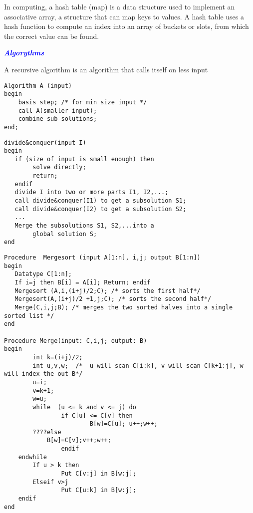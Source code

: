 \documentclass[9pt]{amsart}
\newcommand{\filldots}{\noindent \textbf {\textcolor {blue} {\dotfill}} }
\begin{document}
\begin{multicols}{2}
\noindent In computing, a hash table (map) is a data structure used to implement an associative array, a structure that can map keys to values. A hash table uses a hash function to compute an index into an array of buckets or slots, from which the correct value can be found.

\filldots 

\noindent \textbf {\textcolor {blue} {\em Algorythms}} 
\noindent 
\filldots 

\noindent {\textcolor {blue} {\em Recursion}} 

\noindent A recursive algorithm is an algorithm that calls itself on less input

\begin{lstlisting}
Algorithm A (input)
begin
	basis step; /* for min size input */
	call A(smaller input);
	combine sub-solutions;
end;
\end{lstlisting}

\filldots 

\noindent {\textcolor {blue} {\em Divide and Conquer}} 
\begin{lstlisting}
divide&conquer(input I)
begin
   if (size of input is small enough) then
        solve directly;
        return;
   endif
   divide I into two or more parts I1, I2,...;
   call divide&conquer(I1) to get a subsolution S1;
   call divide&conquer(I2) to get a subsolution S2;
   ...
   Merge the subsolutions S1, S2,...into a
        global solution S;
end
\end{lstlisting}

\noindent {\textcolor {blue} {\em MergeSort}} 

\begin{lstlisting}
Procedure  Mergesort (input A[1:n], i,j; output B[1:n])
begin
   Datatype C[1:n];
   If i=j then B[i] = A[i]; Return; endif
   Mergesort (A,i,(i+j)/2;C); /* sorts the first half*/
   Mergesort(A,(i+j)/2 +1,j;C); /* sorts the second half*/
   Merge(C,i,j;B); /* merges the two sorted halves into a single sorted list */
end

Procedure Merge(input: C,i,j; output: B)
begin
        int k=(i+j)/2;
        int u,v,w;  /*  u will scan C[i:k], v will scan C[k+1:j], w will index the out B*/
        u=i;
        v=k+1;
        w=u;
        while  (u <= k and v <= j) do
                if C[u] <= C[v] then
                        B[w]=C[u]; u++;w++;
		????else
			B[w]=C[v];v++;w++;
        		endif
	endwhile
        If u > k then
                Put C[v:j] in B[w:j];
        Elseif v>j
                Put C[u:k] in B[w:j];
	endif 
end


\end{lstlisting}
\end{multicols}
\end{document}
